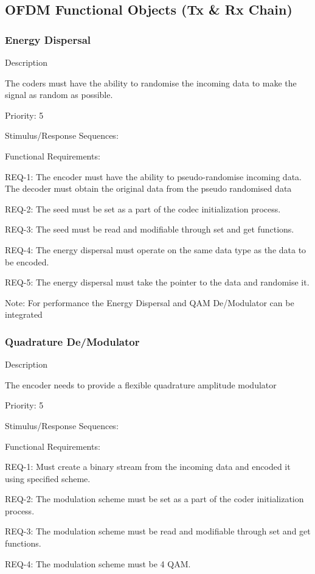 \documentclass[]{report}
\begin{document}
\subsection{OFDM Functional Objects (Tx \& Rx Chain)}


\subsubsection{Energy Dispersal}

Description  \par
The coders must have the ability to randomise the incoming data to make the signal as random as possible. \par
Priority: 5 \par

Stimulus/Response Sequences: \par


Functional Requirements: \par

REQ-1: The encoder must have the ability to pseudo-randomise incoming data. The decoder must obtain the original data from the pseudo randomised data \par
REQ-2: The seed must be set as a part of the codec initialization process. \par
REQ-3: The seed must be read and modifiable through set and get functions. \par
REQ-4: The energy dispersal must operate on the same data type as the data to be encoded. \par
REQ-5: The energy dispersal must take the pointer to the data and randomise it. \par

Note: For performance the Energy Dispersal and QAM De/Modulator can be integrated 

\subsubsection{Quadrature De/Modulator }

Description \par
The encoder needs to provide a flexible quadrature amplitude modulator \par
Priority: 5

Stimulus/Response Sequences: \par 

Functional Requirements: \par

REQ-1: Must create a binary stream from the incoming data and encoded it using specified scheme. \par
REQ-2: The modulation scheme must be set as a part of the coder initialization process. \par
REQ-3: The modulation scheme must be read and modifiable through set and get functions. \par
REQ-4: The modulation scheme must be 4 QAM. \par
\end{document}
